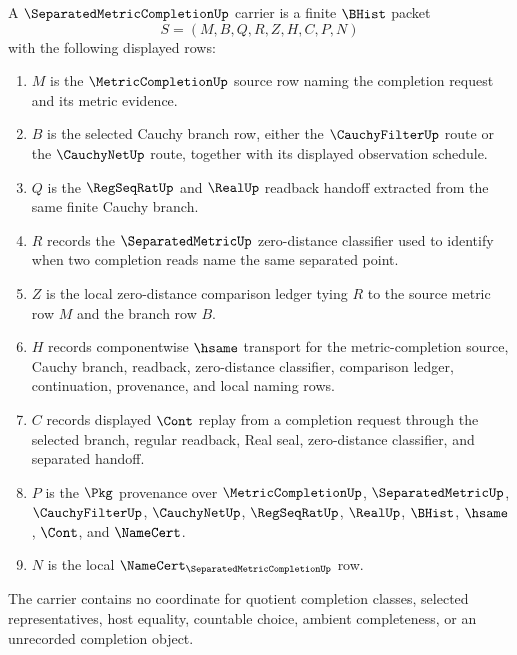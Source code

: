 \begin{definition}
\label{def:separated-metric-completion-carrier}
A $\SeparatedMetricCompletionUp$ carrier is a finite $\BHist$ packet
$$
S=(M,B,Q,R,Z,H,C,P,N)
$$
with the following displayed rows:
\begin{enumerate}
\item $M$ is the $\MetricCompletionUp$ source row naming the completion request and its metric evidence.
\item $B$ is the selected Cauchy branch row, either the $\CauchyFilterUp$ route or the $\CauchyNetUp$ route, together with its displayed observation schedule.
\item $Q$ is the $\RegSeqRatUp$ and $\RealUp$ readback handoff extracted from the same finite Cauchy branch.
\item $R$ records the $\SeparatedMetricUp$ zero-distance classifier used to identify when two completion reads name the same separated point.
\item $Z$ is the local zero-distance comparison ledger tying $R$ to the source metric row $M$ and the branch row $B$.
\item $H$ records componentwise $\hsame$ transport for the metric-completion source, Cauchy branch, readback, zero-distance classifier, comparison ledger, continuation, provenance, and local naming rows.
\item $C$ records displayed $\Cont$ replay from a completion request through the selected branch, regular readback, Real seal, zero-distance classifier, and separated handoff.
\item $P$ is the $\Pkg$ provenance over $\MetricCompletionUp$, $\SeparatedMetricUp$, $\CauchyFilterUp$, $\CauchyNetUp$, $\RegSeqRatUp$, $\RealUp$, $\BHist$, $\hsame$, $\Cont$, and $\NameCert$.
\item $N$ is the local $\NameCert_{\SeparatedMetricCompletionUp}$ row.
\end{enumerate}
The carrier contains no coordinate for quotient completion classes, selected representatives, host equality, countable choice, ambient completeness, or an unrecorded completion object.
\end{definition}


